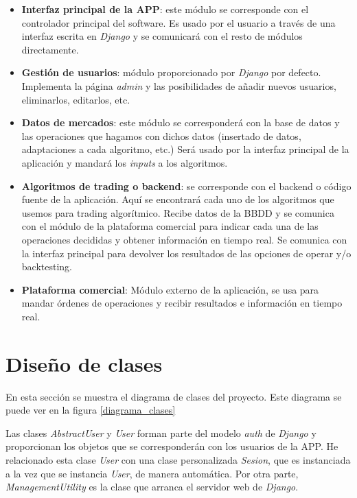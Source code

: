 \begin{itemize}
	\item \textbf{Interfaz principal de la APP}: este módulo se corresponde con el controlador principal del software. Es usado por el usuario a través de una interfaz escrita en \textit{Django} y se comunicará con el resto de módulos directamente.
	\item \textbf{Gestión de usuarios}: módulo proporcionado por \textit{Django} por defecto. Implementa la página \textit{admin} y las posibilidades de añadir nuevos usuarios, eliminarlos, editarlos, etc. 
	\item \textbf{Datos de mercados}: este módulo se corresponderá con la base de datos y las operaciones que hagamos con dichos datos (insertado de datos, adaptaciones a cada algoritmo, etc.) Será usado por la interfaz principal de la aplicación y mandará los \textit{inputs} a los algoritmos.
	\item \textbf{Algoritmos de trading o backend}: se corresponde con el backend o código fuente de la aplicación. Aquí se encontrará cada uno de los algoritmos que usemos para trading algorítmico. Recibe datos de la BBDD y se comunica con el módulo de la plataforma comercial para indicar cada una de las operaciones decididas y obtener información en tiempo real. Se comunica con la interfaz principal para devolver los resultados de las opciones de operar y/o backtesting.
	\item \textbf{Plataforma comercial}: Módulo externo de la aplicación, se usa para mandar órdenes de operaciones y recibir resultados e información en tiempo real.
\end{itemize}

\section{Diseño de clases}

En esta sección se muestra el diagrama de clases del proyecto. Este diagrama se puede ver en la figura \ref{diagrama_clases} \newline

Las clases \textit{AbstractUser} y \textit{User} forman parte del modelo \textit{auth} de \textit{Django} y proporcionan los objetos que se corresponderán con los usuarios de la APP. He relacionado esta clase \textit{User} con una clase personalizada \textit{Sesion}, que es instanciada a la vez que se instancia \textit{User}, de manera automática. Por otra parte, \textit{ManagementUtility} es la clase que arranca el servidor web de \textit{Django}.\newline

